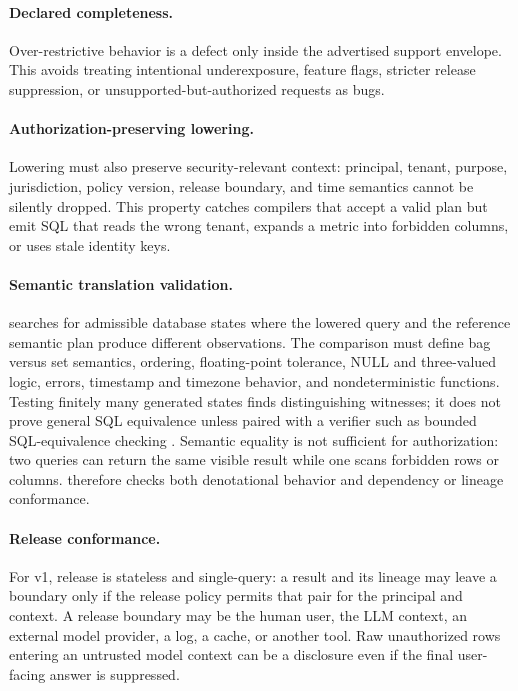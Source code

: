 \paragraph{Declared completeness.}
Over-restrictive behavior is a defect only inside the advertised support envelope. This avoids treating intentional underexposure, feature flags, stricter release suppression, or unsupported-but-authorized requests as bugs.

\paragraph{Authorization-preserving lowering.}
Lowering must also preserve security-relevant context: principal, tenant, purpose, jurisdiction, policy version, release boundary, and time semantics cannot be silently dropped. This property catches compilers that accept a valid plan but emit SQL that reads the wrong tenant, expands a metric into forbidden columns, or uses stale identity keys.

\paragraph{Semantic translation validation.}
\policystrata{} searches for admissible database states where the lowered query and the reference semantic plan produce different observations. The comparison must define bag versus set semantics, ordering, floating-point tolerance, NULL and three-valued logic, errors, timestamp and timezone behavior, and nondeterministic functions. Testing finitely many generated states finds distinguishing witnesses; it does not prove general SQL equivalence unless paired with a verifier such as bounded SQL-equivalence checking \citep{verieql,spotit}. Semantic equality is not sufficient for authorization: two queries can return the same visible result while one scans forbidden rows or columns. \policystrata{} therefore checks both denotational behavior and dependency or lineage conformance.

\paragraph{Release conformance.}
For v1, release is stateless and single-query: a result and its lineage may leave a boundary only if the release policy permits that pair for the principal and context. A release boundary may be the human user, the LLM context, an external model provider, a log, a cache, or another tool. Raw unauthorized rows entering an untrusted model context can be a disclosure even if the final user-facing answer is suppressed.

